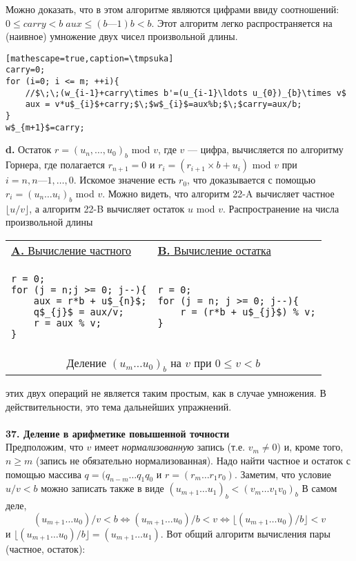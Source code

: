 \documentclass{mai_book}
\begin{document}
\noindent Можно доказать, что в этом алгоритме являются цифрами ввиду
соотношений: $0\leqslant carry < b\;aux\leqslant(b —1)b < b$. Этот алгоритм легко распространяется на (наивное) умножение двух чисел произвольной
длины.
\def\tmpsuka{Вычисление $v\times(u_{m}\ldots u_{0})_b,0\leqslant v<b$}

\begin{lstlisting}[mathescape=true,caption=\tmpsuka]
carry=0;
for (i=0; i <= m; ++i){
	//$\;\;(w_{i-1}+carry\times b'=(u_{i-1}\ldots u_{0})_{b}\times v$
	aux = v*u$_{i}$+carry;$\;$w$_{i}$=aux%b;$\;$carry=aux/b;
}
w$_{m+1}$=carry;
\end{lstlisting}

\textbf{d.} Остаток $r = (u_{n},\ldots,u_{0})_{b}$ mod $v$, где $v$ — цифра, вычисляется по
алгоритму Горнера, где полагается $r_{n+1} = 0$ и $r_{i} = (r_{i+1}\times b + u_{i})$ mod $v$
при $i = n,n—1,\ldots,0$. Искомое значение есть $r_{0}$, что доказывается
с помощью $r_{i}=(u_{n}\ldots u_{i})_{b}$ mod $v$. Можно видеть, что алгоритм 22-A
вычисляет частное $\lfloor u/v\rfloor$, а алгоритм 22-B вычисляет остаток $u$ mod $v$.
Распространение на числа произвольной длины
\begin{table}[h!]
\centering
\begin{tabular}{|l|l|}
\hline
\underline{\textbf{A.} Вычисление частного} & \underline{\textbf{B.} Вычисление остатка} \\
{\begin{lstlisting}[mathescape=true, frame=none]
r = 0;
for (j = n;j >= 0; j--){
	aux = r*b + u$_{n}$;
	q$_{j}$ = aux/v;
	r = aux % v;
}	
\end{lstlisting}} & 
{\begin{lstlisting}[mathescape=true, frame=none]
r = 0;
for (j = n; j >= 0; j--){
	r = (r*b + u$_{j}$) % v;
}
\end{lstlisting}}	
\\ \hline

\multicolumn{2}{c}{{\large Деление $(u_{m}\ldots u_{0})_b$ на $v$ при $0\leqslant v<b$}}
\end{tabular}
\end{table}
этих двух операций не является таким простым, как в случае умноже­ния. В действительности, это тема дальнейших упражнений.
\\\\
\noindent\textbf{37. Деление в арифметике повышенной точности}
\\

Предположим, что $v$ имеет \textit{нормализованную } запись (т.е. $v_{m} \neq 0$)
и, кроме того, $n \geqslant m$ (запись не обязательно нормализованная). Надо
найти частное и остаток с помощью массива $q = (q_{n-m}\ldots q_{1}q_{0}$ и $r = (r_{m}\ldots r_{1}r_{0})$. Заметим, что условие $u/v < b$ можно записать также в
виде $(u_{m+1}\ldots u_{1})_{b}<(v_{m}\ldots v_{1}v_{0})_{b}$ В самом деле,
$$(u_{m+1}\ldots u_{0})/v<b \Leftrightarrow (u_{m+1}\ldots u_{0})/b<v \Leftrightarrow \lfloor(u_{m+1}\ldots u_{0})/b\rfloor<v$$
\newpage
\noindent и $\lfloor(u_{m+1}\ldots u_{0})/b\rfloor=(u_{m+1}\ldots u_{1})$. Вот общий алгоритм вычисления пары (частное, остаток):
\end{document}
